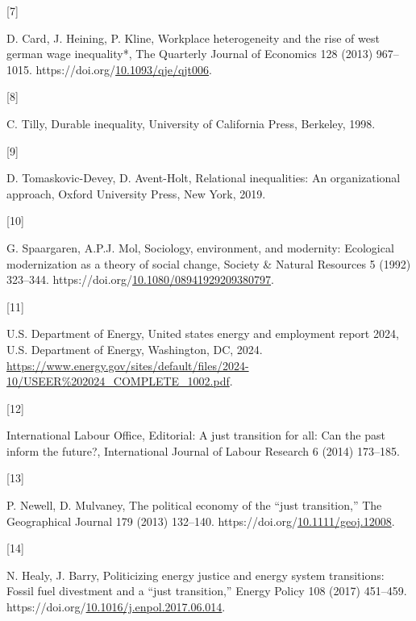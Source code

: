 \documentclass[
  11pt,
]{article}
\newlength{\cslhangindent}
\newlength{\csllabelwidth}
\newenvironment{CSLReferences}[2] %
 {\begin{list}{}{%
  \setlength{\itemindent}{0pt}
  \setlength{\leftmargin}{0pt}
  \setlength{\parsep}{0pt}
  \ifodd #1
   \setlength{\leftmargin}{\cslhangindent}
   \setlength{\itemindent}{-1\cslhangindent}
  \fi
  \setlength{\itemsep}{#2\baselineskip}}}
 {\end{list}}
\newcommand{\CSLLeftMargin}[1]{\parbox[t]{\csllabelwidth}{\strut#1\strut}}
\newcommand{\CSLRightInline}[1]{\parbox[t]{\linewidth - \csllabelwidth}{\strut#1\strut}}
\begin{document}
\begin{CSLReferences}{0}{0}
\CSLLeftMargin{{[}7{]} }%
\CSLRightInline{D. Card, J. Heining, P. Kline, Workplace heterogeneity
and the rise of west german wage inequality*, The Quarterly Journal of
Economics 128 (2013) 967--1015.
https://doi.org/\href{https://doi.org/10.1093/qje/qjt006}{10.1093/qje/qjt006}.}

\CSLLeftMargin{{[}8{]} }%
\CSLRightInline{C. Tilly, Durable inequality, University of California
Press, Berkeley, 1998.}

\CSLLeftMargin{{[}9{]} }%
\CSLRightInline{D. Tomaskovic-Devey, D. Avent-Holt, Relational
inequalities: An organizational approach, Oxford University Press, New
York, 2019.}

\CSLLeftMargin{{[}10{]} }%
\CSLRightInline{G. Spaargaren, A.P.J. Mol, Sociology, environment, and
modernity: Ecological modernization as a theory of social change,
Society \& Natural Resources 5 (1992) 323--344.
https://doi.org/\href{https://doi.org/10.1080/08941929209380797}{10.1080/08941929209380797}.}

\CSLLeftMargin{{[}11{]} }%
\CSLRightInline{U.S. Department of Energy, United states energy and
employment report 2024, U.S. Department of Energy, Washington, DC, 2024.
\url{https://www.energy.gov/sites/default/files/2024-10/USEER\%202024_COMPLETE_1002.pdf}.}

\CSLLeftMargin{{[}12{]} }%
\CSLRightInline{International Labour Office, Editorial: A just
transition for all: Can the past inform the future?, International
Journal of Labour Research 6 (2014) 173--185.}

\CSLLeftMargin{{[}13{]} }%
\CSLRightInline{P. Newell, D. Mulvaney, The political economy of the
{``just transition,''} The Geographical Journal 179 (2013) 132--140.
https://doi.org/\href{https://doi.org/10.1111/geoj.12008}{10.1111/geoj.12008}.}

\CSLLeftMargin{{[}14{]} }%
\CSLRightInline{N. Healy, J. Barry, Politicizing energy justice and
energy system transitions: Fossil fuel divestment and a {``just
transition,''} Energy Policy 108 (2017) 451--459.
https://doi.org/\href{https://doi.org/10.1016/j.enpol.2017.06.014}{10.1016/j.enpol.2017.06.014}.}


\end{CSLReferences}
\end{document}

